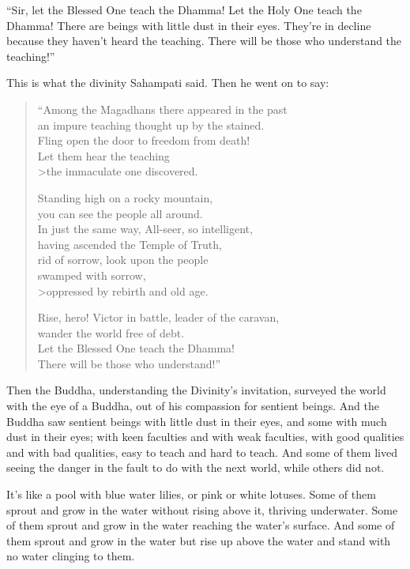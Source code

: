 \documentclass[12pt,openany]{book}%
\begin{document}
“Sir, let the Blessed One teach the Dhamma! Let the Holy One teach the Dhamma! There are beings with little dust in their eyes. They’re in decline because they haven’t heard the teaching. There will be those who understand the teaching!” 

This is what the divinity Sahampati said. Then he went on to say: 

\begin{verse}%
“Among the Magadhans there appeared in the past \\
an impure teaching thought up by the stained. \\
Fling open the door to freedom from death! \\
Let them hear the teaching \\>the immaculate one discovered. 

Standing high on a rocky mountain, \\
you can see the people all around. \\
In just the same way, All-seer, so intelligent, \\
having ascended the Temple of Truth, \\
rid of sorrow, look upon the people \\
swamped with sorrow,  \\>oppressed by rebirth and old age. 

Rise, hero! Victor in battle, leader of the caravan, \\
wander the world free of debt. \\
Let the Blessed One teach the Dhamma! \\
There will be those who understand!” 

%
\end{verse}

Then the Buddha, understanding the Divinity’s invitation, surveyed the world with the eye of a Buddha, out of his compassion for sentient beings. And the Buddha saw sentient beings with little dust in their eyes, and some with much dust in their eyes; with keen faculties and with weak faculties, with good qualities and with bad qualities, easy to teach and hard to teach. And some of them lived seeing the danger in the fault to do with the next world, while others did not. 

It’s like a pool with blue water lilies, or pink or white lotuses. Some of them sprout and grow in the water without rising above it, thriving underwater. Some of them sprout and grow in the water reaching the water’s surface. And some of them sprout and grow in the water but rise up above the water and stand with no water clinging to them. 
\end{document}
